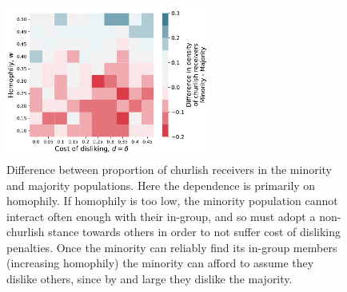 \documentclass[11pt,letterpaper]{article}
\begin{document}
\begin{figure}[H]
  \centering
    \includegraphics[width=0.6\textwidth]{Figures/churlish_receivers_diff_005.pdf}
  \caption{Difference between proportion of churlish receivers in the minority 
    and majority populations. Here the dependence is primarily on homophily.
    If homophily is too low, the minority population cannot interact often
    enough with their in-group, and so must adopt a non-churlish stance towards
    others in order to not suffer cost of disliking penalties. Once the minority
    can reliably find its in-group members (increasing homophily) the minority
    can afford to assume they dislike others, since by and large they dislike
    the majority.
  }
  \label{fig:}
\end{figure}





% 


% 
\end{document}
